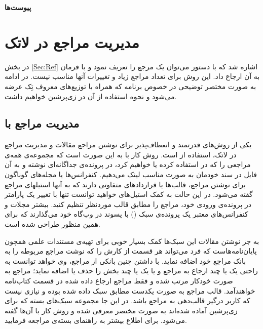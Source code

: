 
\vspace*{7cm}
\begin{center}
	\fontsize{38pt}{38pt}\selectfont
	\textbf{پیوست‌ها}
\end{center}
\thispagestyle{empty}
%
    
\chapter{مدیریت مراجع در لاتک}\label{App:RefMan}
در بخش \ref{Sec:Ref} اشاره شد که با دستور 
  می‌توان یک مرجع را تعریف نمود و با فرمان
  به آن ارجاع داد. این روش برای تعداد مراجع زیاد و تغییرات آنها مناسب نیست. در ادامه به صورت مختصر توضیحی در خصوص برنامه  که همراه با توزیع‌های معروف تِک عرضه می‌شود و نحوه استفاده از آن در زی‌پرشین خواهیم داشت.

\section{ مدیریت مراجع با  \texorpdfstring{}{Bib\TeX} }
یکی از روش‌های قدرتمند و انعطاف‌پذیر برای نوشتن مراجع مقالات و مدیریت مراجع در لاتک، استفاده از   است.
 روش کار با   به این صورت است که مجموعه‌ی همه‌ی مراجعی را که در \پ استفاده کرده یا خواهیم کرد، 
در پرونده‌ی جداگانه‌ای نوشته و به آن فایل در سند خودمان به صورت مناسب لینک می‌دهیم.
 کنفرانس‌ها یا مجله‌های گوناگون برای نوشتن مراجع، قالب‌ها یا قراردادهای متفاوتی دارند که به آنها استیلهای مراجع گفته می‌شود.
 در این حالت به کمک ‌استیل‌های  خواهید توانست تنها با تغییر یک پارامتر در پرونده‌ی ورودی خود، مراجع را مطابق قالب موردنظر تنظیم کنید. 
 بیشتر مجلات و کنفرانس‌های معتبر یک پرونده‌ی سبک () با پسوند  در وب‌گاه خود می‌گذارند که برای همین منظور طراحی شده است.

به جز نوشتن مقالات این سبک‌ها کمک بسیار خوبی برای تهیه‌ی مستندات علمی همچون پایان‌نامه‌هاست که فرد می‌تواند هر قسمت از کارش را که نوشت مراجع مربوطه را به بانک مراجع خود اضافه نماید. با داشتن چنین بانکی از مراجع، وی خواهد توانست به راحتی یک یا چند ارجاع به مراجع و یا یک یا چند بخش را حذف یا اضافه ‌نماید؛ 
مراجع به صورت خودکار مرتب شده و فقط مراجع ارجاع داده شده در قسمت کتاب‌نامه خواهندآمد. قالب مراجع به صورت یکدست مطابق سبک داده شده بوده و نیازی نیست که کاربر درگیر قالب‌دهی به مراجع باشد. 
در این جا مجموعه‌ سبک‌های بسته  که برای  زی‌پرشین آماده شده‌اند به صورت مختصر معرفی شده و روش کار با آن‌ها گفته می‌شود. برای اطلاع بیشتر به راهنمای بسته‌ی  مراجعه فرمایید.

